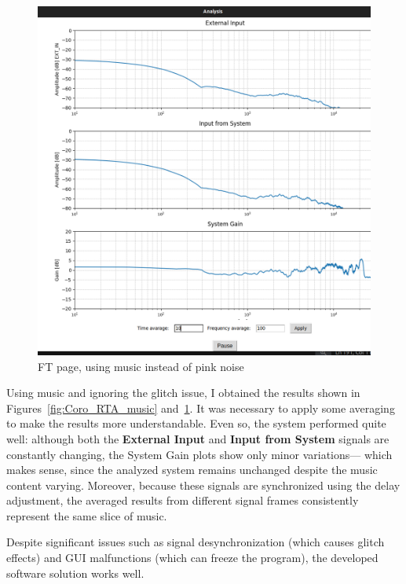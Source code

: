 \begin{figure}[H]
	\centering
	\includegraphics[width=0.8
	\linewidth]{Figures/Coro_FT_music_EQX32.png}
	\caption{FT page, using music instead of pink noise}
	\label{fig:Coro_FT_music}
\end{figure}

Using music and ignoring the glitch issue, I obtained the results shown in Figures~\ref{fig:Coro_RTA_music} and~\ref{fig:Coro_FT_music}. It was necessary to apply some averaging to make the results more understandable. Even so, the system performed quite well: although both the \textbf{External Input} and \textbf{Input from System} signals are constantly changing, the System Gain plots show only minor variations— which makes sense, since the analyzed system remains unchanged despite the music content varying. Moreover, because these signals are synchronized using the delay adjustment, the averaged results from different signal frames consistently represent the same slice of music.

Despite significant issues such as signal desynchronization (which causes glitch effects) and GUI malfunctions (which can freeze the program), the developed software solution works well.

